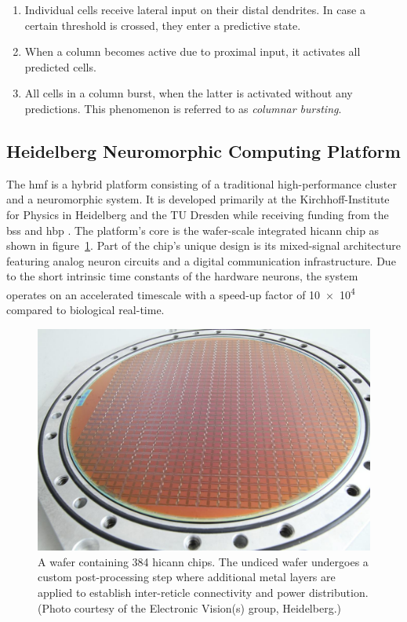 \begin{enumerate}
	\item Individual cells receive lateral input on their distal dendrites. In case a certain threshold is crossed, they enter a predictive state.
	\item\label{enm:temporal_memory_predictive} When a column becomes active due to proximal input, it activates all predicted cells.
	\item\label{enm:temporal_memory_bursting} All cells in a column burst, when the latter is activated without any predictions. This phenomenon is referred to as \emph{columnar bursting}.
\end{enumerate}

\subsection{Heidelberg Neuromorphic Computing Platform}

The \gls{hmf} is a hybrid platform consisting of a traditional high-performance cluster and a neuromorphic system. It is developed primarily at the Kirchhoff-Institute for Physics in Heidelberg and the TU Dresden while receiving funding from the \gls{bss} and \gls{hbp} \citep{hbp2014sp9spec}. The platform's core is the wafer-scale integrated \gls{hicann} chip as shown in figure~\ref{fig:wafer}. Part of the chip's unique design is its mixed-signal architecture featuring analog neuron circuits and a digital communication infrastructure. Due to the short intrinsic time constants of the hardware neurons, the system operates on an accelerated timescale with a speed-up factor of \num{10e4} compared to biological real-time.

\begin{figure}
	\begin{center}
		\includegraphics[width=\columnwidth]{assets/wafer.jpg}
	\end{center}
	\caption{A wafer containing 384 \gls{hicann} chips. The undiced wafer undergoes a custom post-processing step where additional metal layers are applied to establish inter-reticle connectivity and power distribution. (Photo courtesy of the Electronic Vision(s) group, Heidelberg.)}
	\label{fig:wafer}
\end{figure}


